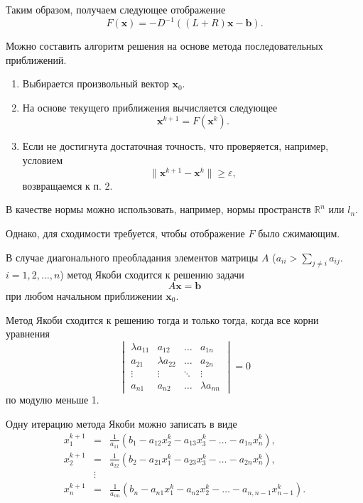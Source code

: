 Таким образом, получаем следующее отображение
\[
F(\mathbf{x})=-D^{-1}\left((L+R)\mathbf{x}-\mathbf{b}\right).
\]


Можно составить алгоритм решения на основе метода последовательных
приближений.
\begin{enumerate}
\item Выбирается произвольный вектор $\mathbf{x}_{0}$.
\item На основе текущего приближения вычисляется следующее
\[
\mathbf{x}^{k+1}=F(\mathbf{x}^{k}).
\]

\item Если не достигнута достаточная точность, что проверяется, например,
условием
\[
\|\mathbf{x}^{k+1}-\mathbf{x}^{k}\|\geqslant\varepsilon,
\]
возвращаемся к п. 2.
\end{enumerate}
В качестве нормы можно использовать, например, нормы пространств $\mathbb{R}^{n}$
или $l_{n}$.

Однако, для сходимости требуется, чтобы отображение $F$ было сжимающим.
\begin{thm}
В случае диагонального преобладания элементов матрицы $A$ ($a_{ii}>\sum_{j\neq i}a_{ij}$.
$i=1,2,\ldots,n$) метод Якоби сходится к решению задачи
\[
A\mathbf{x}=\mathbf{b}
\]
при любом начальном приближении $\mathbf{x}_{0}$.
\end{thm}

\begin{thm}
Метод Якоби сходится к решению тогда и только тогда, когда все корни
уравнения \textup{
\[
\begin{vmatrix}\lambda a_{11} & a_{12} & \ldots & a_{1n}\\
a_{21} & \lambda a_{22} & \ldots & a_{2n}\\
\vdots & \vdots & \ddots & \vdots\\
a_{n1} & a_{n2} & \ldots & \lambda a_{nn}
\end{vmatrix}=0
\]
}по модулю меньше 1.
\end{thm}
Одну итерацию метода Якоби можно записать в виде
\begin{eqnarray*}
x_{1}^{k+1} & = & \frac{1}{a_{11}}\left(b_{1}-a_{12}x_{2}^{k}-a_{13}x_{3}^{k}-\ldots-a_{1n}x_{n}^{k}\right),\\
x_{2}^{k+1} & = & \frac{1}{a_{22}}\left(b_{2}-a_{21}x_{1}^{k}-a_{23}x_{3}^{k}-\ldots-a_{2n}x_{n}^{k}\right),\\
 & \vdots\\
x_{n}^{k+1} & = & \frac{1}{a_{nn}}\left(b_{n}-a_{n1}x_{1}^{k}-a_{n2}x_{2}^{k}-\ldots-a_{n,n-1}x_{n-1}^{k}\right).
\end{eqnarray*}


